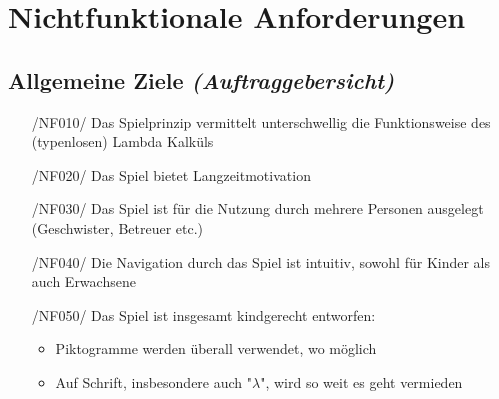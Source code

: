 \section{Nichtfunktionale Anforderungen}

\subsection{Allgemeine Ziele \textit{(Auftraggebersicht)}}
\begin{itemize}
	\item[/NF010/] Das Spielprinzip vermittelt unterschwellig die Funktionsweise des (typenlosen) Lambda Kalküls
	\item[/NF020/] Das Spiel bietet Langzeitmotivation
	\item[/NF030/] Das Spiel ist für die Nutzung durch mehrere Personen ausgelegt (Geschwister, Betreuer etc.)
	\item[/NF040/] Die Navigation durch das Spiel ist intuitiv, sowohl für Kinder als auch Erwachsene
	\item[/NF050/] Das Spiel ist insgesamt kindgerecht entworfen:
		\begin{itemize}
			\item Piktogramme werden überall verwendet, wo möglich
			\item Auf Schrift, insbesondere auch "$\lambda$", wird so weit es geht vermieden
		\end{itemize}
\end{itemize}


